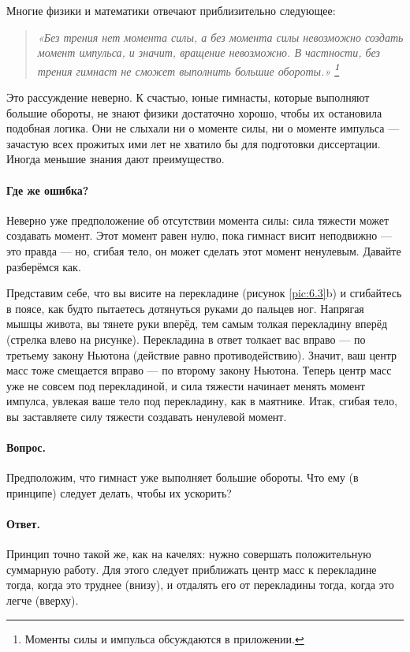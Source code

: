 Многие физики и математики отвечают приблизительно следующее:
\begin{quote}
\emph{«Без трения нет момента силы, а без момента силы невозможно создать момент импульса,
и значит, вращение невозможно.
В частности, без трения гимнаст не сможет выполнить большие обороты.»
\footnote{Моменты силы и импульса обсуждаются в приложении.}}
\end{quote}

Это рассуждение неверно.
К счастью, юные гимнасты, которые выполняют большие обороты, не знают физики достаточно хорошо, чтобы их остановила подобная логика.
Они не слыхали ни о моменте силы, ни о моменте импульса ---
зачастую всех прожитых ими лет не хватило бы для подготовки диссертации.
Иногда меньшие знания дают преимущество.

\paragraph{Где же ошибка?}
Неверно уже предположение об отсутствии момента силы: сила тяжести может создавать момент.
Этот момент равен нулю, пока гимнаст висит неподвижно --- это правда --- но, сгибая тело, он может сделать этот момент ненулевым.
Давайте разберёмся как.

Представим себе, что вы висите на перекладине (рисунок \ref{pic:6.3}b)
и сгибайтесь в поясе, как будто пытаетесь дотянуться руками до пальцев ног.
Напрягая мышцы живота, вы тянете руки вперёд, тем самым толкая перекладину вперёд (стрелка влево на рисунке).
Перекладина в ответ толкает вас вправо — по третьему закону Ньютона (действие равно противодействию).
Значит, ваш центр масс тоже смещается вправо — по второму закону Ньютона.
Теперь центр масс уже не совсем под перекладиной, и сила тяжести начинает менять момент импулса, увлекая ваше тело под перекладину, как в маятнике.
Итак, сгибая тело, вы заставляете силу тяжести создавать ненулевой момент.

\paragraph{Вопрос.}
Предположим, что гимнаст уже выполняет большие обороты.
Что ему (в принципе) следует делать, чтобы их ускорить?

\paragraph{Ответ.}
Принцип точно такой же, как на качелях: нужно совершать положительную суммарную работу.
Для этого следует приближать центр масс к перекладине тогда, когда это труднее (внизу), и отдалять его от перекладины тогда, когда это легче (вверху).

